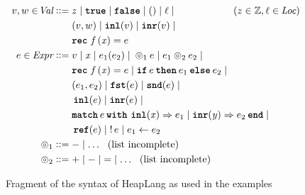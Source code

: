 \documentclass[thesis.tex]{subfiles}
\begin{document}
\begin{figure}[ht]
  \begin{center}
    \begin{align*}
      \val,\valB \in \Val \bnfdef{} &
      z \mid
      \True \mid \False \mid
      \TT \mid
      \loc \mid                     \hspace*{2cm} (z \in \integer, \loc \in \Loc)                     \\ &
      (\val,\valB) \mid
      \Inl(\val) \mid
      \Inr(\val) \mid                                                                                 \\ &
      \Rec\lvarF\,(\lvar)= \expr                                                                      \\
      \expr \in \Expr \bnfdef{}     &
      \val \mid
      \lvar \mid
      \expr_1(\expr_2) \mid
      {}
      \HLOp_1 \expr \mid
      \expr_1 \HLOp_2 \expr_2 \mid                                                                    \\ &
      \Rec\lvarF\,(\lvar)= \expr \mid
      \If \expr then \expr_1 \Else \expr_2 \mid
      {}                                                                                              \\ &
      (\expr_1,\expr_2) \mid
      \Fst(\expr) \mid
      \Snd(\expr) \mid
      {}                                                                                              \\ &
      \Inl(\expr) \mid
      \Inr(\expr) \mid                                                                                \\ &
      \Match \expr with \Inl(\lvar) => \expr_1 | \Inr(\lvarB) => \expr_2 end \mid
      {}                                                                                              \\ &
      \Alloc(\expr) \mid
      \deref \expr \mid
      \expr_1 \gets \expr_2                                                                           \\
      \HLOp_1 \bnfdef{}             & - \mid \ldots ~~\text{(list incomplete)}                        \\
      \HLOp_2 \bnfdef{}             & + \mid - \mid \mathop{=} \mid \ldots ~~\text{(list incomplete)}
    \end{align*}
    \caption{Fragment of the syntax of HeapLang as used in the examples}
    \label{fig:heaplangsyntax}
  \end{center}
\end{figure}
\end{document}
